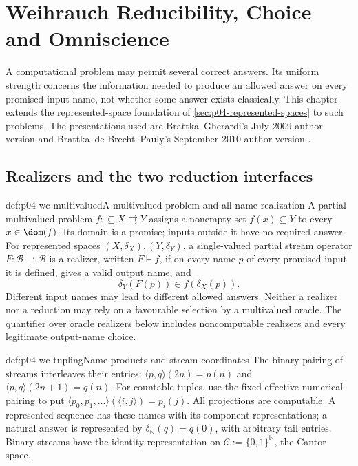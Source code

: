 \chapter{Weihrauch Reducibility, Choice and Omniscience}
\label{sec:p04-weihrauch-choice}

A computational problem may permit several correct answers. Its uniform
strength concerns the information needed to produce an allowed answer on
every promised input name, not whether some answer exists classically.
This chapter extends the represented-space foundation of
\cref{sec:p04-represented-spaces} to such problems. The presentations used
are Brattka--Gherardi's July 2009 author version
\cite{BrattkaGherardi2009OmniscienceV2} and
Brattka--de Brecht--Pauly's September 2010 author version
\cite{BrattkaDeBrechtPauly2010ChoiceV2}.

\section{Realizers and the two reduction interfaces}
\label{sec:p04-wc-realizers}

\begin{hbdefinition}{def:p04-wc-multivalued}{A multivalued problem and all-name realization}
A partial multivalued problem \(f:\subseteq X\rightrightarrows Y\) assigns a
nonempty set \(f(x)\subseteq Y\) to every \(x\in\dom(f)\).
Its domain is a promise; inputs outside it have no required answer.
For represented spaces \((X,\delta_X),(Y,\delta_Y)\), a single-valued
partial stream operator \(F:\mathcal B\rightharpoonup\mathcal B\)
is a realizer, written \(F\vdash f\), if on every name \(p\) of
every promised input it is defined, gives a valid output name, and
\[
 \delta_Y(F(p))\in f(\delta_X(p)).
\]
Different input names may lead to different allowed answers.
Neither a realizer nor a reduction may rely on a favourable selection
by a multivalued oracle. The quantifier over oracle realizers below
includes noncomputable realizers and every legitimate output-name choice.
\end{hbdefinition}

\begin{hbconvention}{def:p04-wc-tupling}{Name products and stream coordinates}
The binary pairing of streams interleaves their entries:
\(\langle p,q\rangle(2n)=p(n)\) and
\(\langle p,q\rangle(2n+1)=q(n)\).
For countable tuples, use the fixed effective numerical pairing to put
\(\langle p_0,p_1,\ldots\rangle(\langle i,j\rangle)=p_i(j)\).
All projections are computable. A represented sequence has these names
with its component representations; a natural answer is represented by
\(\delta_{\mathbb N}(q)=q(0)\), with arbitrary tail entries.
Binary streams have the identity representation on
\(\mathcal C:=\{0,1\}^{\mathbb N}\), the Cantor space.
\end{hbconvention}

